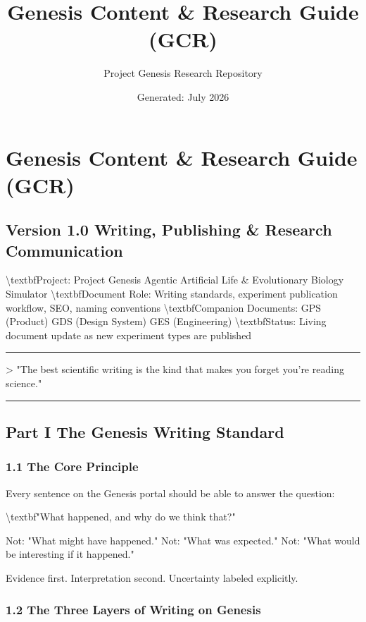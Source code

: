 \documentclass[11pt,a4paper]{article}
\title{\textbf{Genesis Content & Research Guide (GCR)}}
\author{Project Genesis Research Repository}
\date{\small Generated: July 2026}
\begin{document}
\maketitle
\thispagestyle{empty}

\newpage
\section*{Genesis Content \& Research Guide (GCR)}
\subsection*{Version 1.0  Writing, Publishing \& Research Communication}

\textbackslash{}textbf{Project:} Project Genesis  Agentic Artificial Life \& Evolutionary Biology Simulator
\textbackslash{}textbf{Document Role:} Writing standards, experiment publication workflow, SEO, naming conventions
\textbackslash{}textbf{Companion Documents:} GPS (Product)  GDS (Design System)  GES (Engineering)
\textbackslash{}textbf{Status:} Living document  update as new experiment types are published

\noindent\rule{\textwidth}{0.4pt}

\textgreater{} "The best scientific writing is the kind that makes you forget you're reading science."

\noindent\rule{\textwidth}{0.4pt}

\subsection*{Part I  The Genesis Writing Standard}

\subsubsection*{1.1 The Core Principle}

Every sentence on the Genesis portal should be able to answer the question:

\textbackslash{}textbf{"What happened, and why do we think that?"}

Not: "What might have happened."
Not: "What was expected."
Not: "What would be interesting if it happened."

Evidence first. Interpretation second. Uncertainty labeled explicitly.

\subsubsection*{1.2 The Three Layers of Writing on Genesis}
\end{document}
